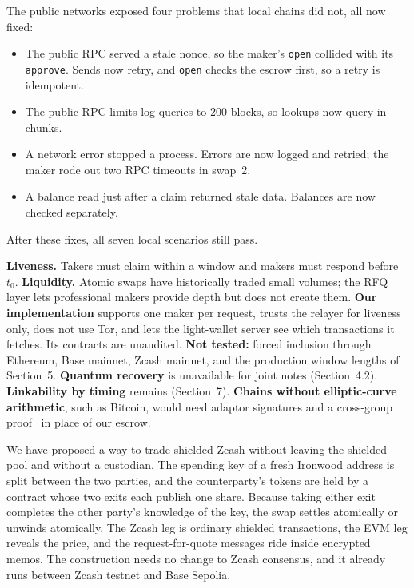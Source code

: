 \documentclass[10pt,letterpaper]{article}
\makeatletter
\renewcommand\section{\@startsection{section}{1}{\z@}{-1.3em}{0.45em}{\normalfont\large\bfseries}}
\newcommand{\fn}[1]{\texttt{#1}}
\makeatother
\begin{document}
The public networks exposed four problems that local chains did not, all now fixed:
\begin{itemize}\setlength\itemsep{0.1em}
\item The public RPC served a stale nonce, so the maker's \fn{open} collided with its \fn{approve}.
Sends now retry, and \fn{open} checks the escrow first, so a retry is idempotent.
\item The public RPC limits log queries to 200 blocks, so lookups now query in chunks.
\item A network error stopped a process. Errors are now logged and retried; the maker rode out two
RPC timeouts in swap~2.
\item A balance read just after a claim returned stale data. Balances are now checked separately.
\end{itemize}
After these fixes, all seven local scenarios still pass.

\section{Limitations}

\textbf{Liveness.} Takers must claim within a window and makers must respond before $t_0$.
\textbf{Liquidity.} Atomic swaps have historically traded small volumes; the RFQ layer lets
professional makers provide depth but does not create them. \textbf{Our implementation} supports one
maker per request, trusts the relayer for liveness only, does not use Tor, and lets the light-wallet
server see which transactions it fetches. Its contracts are unaudited. \textbf{Not tested:} forced
inclusion through Ethereum, Base mainnet, Zcash mainnet, and the production window lengths of
Section~5. \textbf{Quantum recovery} is unavailable for joint notes (Section~4.2).
\textbf{Linkability by timing} remains (Section~7). \textbf{Chains without elliptic-curve
arithmetic}, such as Bitcoin, would need adaptor signatures and a cross-group proof~\cite{gugger,mrl10}
in place of our escrow.

\section{Conclusion}

We have proposed a way to trade shielded Zcash without leaving the shielded pool and without a
custodian. The spending key of a fresh Ironwood address is split between the two parties, and the
counterparty's tokens are held by a contract whose two exits each publish one share. Because taking
either exit completes the other party's knowledge of the key, the swap settles atomically or unwinds
atomically. The Zcash leg is ordinary shielded transactions, the EVM leg reveals the price, and the
request-for-quote messages ride inside encrypted memos. The construction needs no change to Zcash
consensus, and it already runs between Zcash testnet and Base Sepolia.
\end{document}
